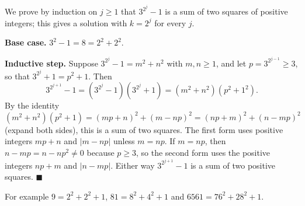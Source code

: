 We prove by induction on $j\ge1$ that $3^{2^j}-1$ is a sum of two squares of positive integers; this gives a solution with $k=2^j$ for every $j$.

\textbf{Base case.} $3^2-1=8=2^2+2^2$.

\textbf{Inductive step.} Suppose $3^{2^j}-1=m^2+n^2$ with $m,n\ge1$, and let $p=3^{2^{j-1}}\ge3$, so that $3^{2^j}+1=p^2+1$. Then
\[3^{2^{j+1}}-1=\left(3^{2^j}-1\right)\left(3^{2^j}+1\right)=(m^2+n^2)(p^2+1^2).\]
By the identity $(m^2+n^2)(p^2+1)=(mp+n)^2+(m-np)^2=(np+m)^2+(n-mp)^2$ (expand both sides), this is a sum of two squares. The first form uses positive integers $mp+n$ and $|m-np|$ unless $m=np$. If $m=np$, then $n-mp=n-np^2\ne0$ because $p\ge3$, so the second form uses the positive integers $np+m$ and $|n-mp|$. Either way $3^{2^{j+1}}-1$ is a sum of two positive squares. $\blacksquare$

For example $9=2^2+2^2+1$, $81=8^2+4^2+1$ and $6561=76^2+28^2+1$.
